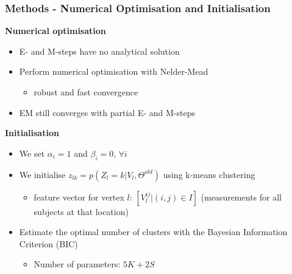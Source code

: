 \begin{frame}
\frametitle{Methods - Numerical Optimisation and Initialisation}

\textbf{Numerical optimisation} 
\begin{itemize}
\item E- and M-steps have no analytical solution
\item Perform numerical optimisation with Nelder-Mead
\begin{itemize}
  \item robust and fast convergence
\end{itemize}
\item EM still converges with partial E- and M-steps
\end{itemize}

\vfill

\textbf{Initialisation}

\begin{itemize}
 \item We set $\alpha_i=1$ and $\beta_i=0$, $\forall i$
 \item We initialise $z_{lk} = p(Z_l = k|V_l,\Theta^{old})$ using k-means clustering
 \begin{itemize}
  \item feature vector for vertex $l$: $\left[ V_l^{ij} | (i,j) \in I \right]$ (measurements for all subjects at that location)
 \end{itemize}

 \item Estimate the optimal number of clusters with the Bayesian Information Criterion (BIC)
 \begin{itemize}
  \item Number of parameters: $5K + 2S$
 \end{itemize}

\end{itemize}

\end{frame}


